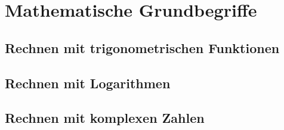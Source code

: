 \chapter{Mathematische Grundbegriffe}
\thispagestyle{empty}

\section{Rechnen mit trigonometrischen Funktionen}

\section{Rechnen mit Logarithmen}

\section{Rechnen mit komplexen Zahlen}


